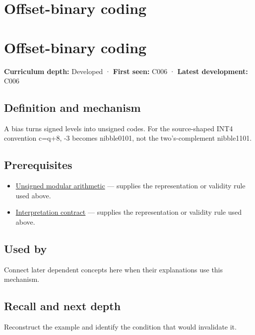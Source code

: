 \hypertarget{appendix-53a8cfb25f8d}{}
\section*{Offset-binary coding}
\section{Offset-binary coding}\label{appendix-53a8cfb25f8d-offset-binary-coding}

\textbf{Curriculum depth:} Developed · \textbf{First seen:} C006 · \textbf{Latest development:} C006

\subsection{Definition and mechanism}\label{appendix-53a8cfb25f8d-definition-and-mechanism}

A bias turns signed levels into unsigned codes. For the source-shaped INT4 convention c=q+8, -3 becomes nibble0101, not the two's-complement nibble1101.

\subsection{Prerequisites}\label{appendix-53a8cfb25f8d-prerequisites}

\begin{itemize}
\tightlist
\item
  \hyperref[appendix-c99977d88b33]{Unsigned modular arithmetic} --- supplies the representation or validity rule used above.
\item
  \hyperref[appendix-f414bd4ed05c]{Interpretation contract} --- supplies the representation or validity rule used above.
\end{itemize}

\subsection{Used by}\label{appendix-53a8cfb25f8d-used-by}

Connect later dependent concepts here when their explanations use this mechanism.

\subsection{Recall and next depth}\label{appendix-53a8cfb25f8d-recall-and-next-depth}

Reconstruct the example and identify the condition that would invalidate it.

